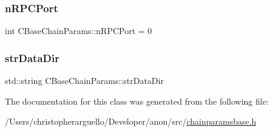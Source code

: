 \subsubsection{\texorpdfstring{n\+R\+P\+C\+Port}{nRPCPort}}
{\footnotesize\ttfamily int C\+Base\+Chain\+Params\+::n\+R\+P\+C\+Port = 0\hspace{0.3cm}{\ttfamily [protected]}}

\mbox{\label{class_c_base_chain_params_af5868778f8c6c676aabc9fb2366d2447}} 
\subsubsection{\texorpdfstring{str\+Data\+Dir}{strDataDir}}
{\footnotesize\ttfamily std\+::string C\+Base\+Chain\+Params\+::str\+Data\+Dir\hspace{0.3cm}{\ttfamily [protected]}}



The documentation for this class was generated from the following file\+:\begin{DoxyCompactItemize}
\item 
/\+Users/christopherarguello/\+Developer/anon/src/\mbox{\hyperlink{chainparamsbase_8h}{chainparamsbase.\+h}}\end{DoxyCompactItemize}
